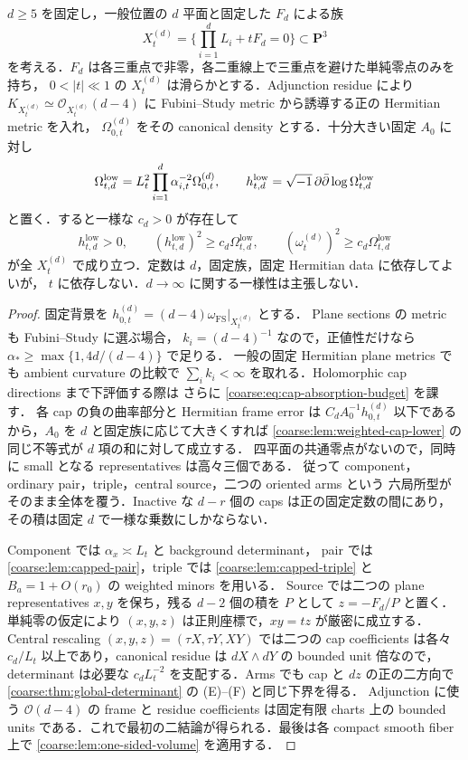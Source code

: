 \documentclass[a4paper,11pt]{ltjsarticle}
\numberwithin{equation}{section}
\theoremstyle{plain}
\theoremstyle{definition}
\theoremstyle{remark}
\newcommand{\PP}{\mathbf P}\newcommand{\CC}{\mathbf C}\newcommand{\RR}{\mathbf R}\newcommand{\ZZ}{\mathbf Z}\newcommand{\NN}{\mathbf N}
\begin{document}
\begin{corollary}
\label{coarse:cor:degree-d-volume-lower}
$d\ge5$ を固定し，一般位置の $d$ 平面と固定した $F_d$ による族
\[
 X_t^{(d)}=\{\prod_{i=1}^dL_i+tF_d=0\}\subset\PP^3
\]
を考える．$F_d$ は各三重点で非零，各二重線上で三重点を避けた単純零点のみを持ち，
$0<|t|\ll1$ の $X_t^{(d)}$ は滑らかとする．Adjunction residue により
$K_{X_t^{(d)}}\simeq\mathcal O_{X_t^{(d)}}(d-4)$ に Fubini--Study metric から誘導する正の Hermitian metric を入れ，
$\Omega_{0,t}^{(d)}$ をその canonical density とする．十分大きい固定 $A_0$ に対し
\[
 \Omega_{t,d}^{\mathrm{low}}
 =L_t^2\prod_{i=1}^d\alpha_{i,t}^{-2}\Omega_{0,t}^{(d)},
 \qquad h_{t,d}^{\mathrm{low}}=\sqrt{-1}\,\partial\bar\partial\log\Omega_{t,d}^{\mathrm{low}}
\]
と置く．すると一様な $c_d>0$ が存在して
\begin{equation}\label{coarse:eq:degree-d-volume-lower}
 h_{t,d}^{\mathrm{low}}>0,\qquad
 (h_{t,d}^{\mathrm{low}})^2\ge c_d\Omega_{t,d}^{\mathrm{low}},\qquad
 (\omega_t^{(d)})^2\ge c_d\Omega_{t,d}^{\mathrm{low}}
\end{equation}
が全 $X_t^{(d)}$ で成り立つ．定数は $d$，固定族，固定 Hermitian data に依存してよいが，
$t$ に依存しない．$d\to\infty$ に関する一様性は主張しない．
\end{corollary}

\begin{proof}
固定背景を $h_{0,t}^{(d)}=(d-4)\omega_{\mathrm{FS}}|_{X_t^{(d)}}$ とする．
Plane sections の metric も Fubini--Study に選ぶ場合，
$k_i=(d-4)^{-1}$ なので，正値性だけなら
$\alpha_*\ge\max\{1,4d/(d-4)\}$ で足りる．
一般の固定 Hermitian plane metrics でも ambient curvature の比較で
$\sum_i k_i<\infty$ を取れる．Holomorphic cap directions まで下評価する際は
さらに \eqref{coarse:eq:cap-absorption-budget} を課す．
各 cap の負の曲率部分と Hermitian frame error は
$C_d A_0^{-1}h_{0,t}^{(d)}$ 以下であるから，$A_0$ を $d$ と固定族に応じて大きくすれば
\cref{coarse:lem:weighted-cap-lower} の同じ不等式が $d$ 項の和に対して成立する．
四平面の共通零点がないので，同時に small となる representatives は高々三個である．
従って component，ordinary pair，triple，central source，二つの oriented arms という
六局所型がそのまま全体を覆う．Inactive な $d-r$ 個の caps は正の固定定数の間にあり，
その積は固定 $d$ で一様な乗数にしかならない．

Component では $\alpha_x\asymp L_t$ と background determinant，
pair では \cref{coarse:lem:capped-pair}，triple では
\cref{coarse:lem:capped-triple} と $B_a=1+O(r_0)$ の weighted minors を用いる．
Source では二つの plane representatives $x,y$ を保ち，残る $d-2$ 個の積を $P$ として
$z=-F_d/P$ と置く．単純零の仮定により $(x,y,z)$ は正則座標で，$xy=tz$ が厳密に成立する．
Central rescaling $(x,y,z)=(\tau X,\tau Y,XY)$ では二つの cap coefficients は各々
$c_d/L_t$ 以上であり，canonical residue は $dX\wedge dY$ の bounded unit 倍なので，
determinant は必要な $c_dL_t^{-2}$ を支配する．Arms でも cap と $dz$ の正の二方向で
\cref{coarse:thm:global-determinant} の (E)--(F) と同じ下界を得る．
Adjunction に使う $\mathcal O(d-4)$ の frame と residue coefficients は固定有限 charts 上の
bounded units である．これで最初の二結論が得られる．最後は各 compact smooth fiber 上で
\cref{coarse:lem:one-sided-volume} を適用する．
\end{proof}
\end{document}
